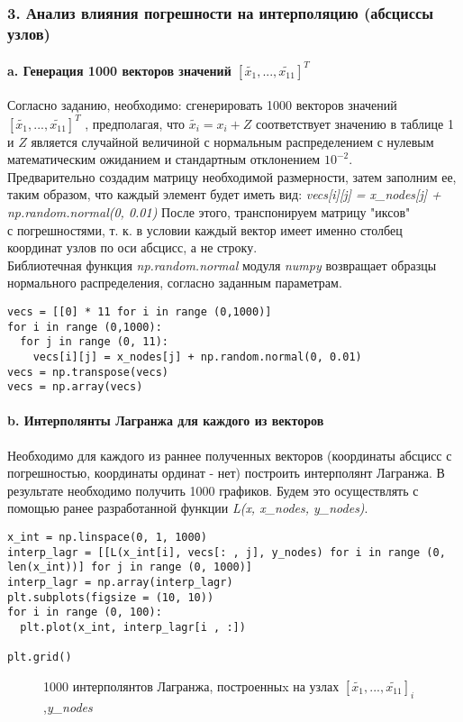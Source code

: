 \subsubsection{3. Анализ влияния погрешности на интерполяцию (абсциссы узлов)}
\paragraph{a. Генерация 1000 векторов значений $[\tilde{x_1}, ..., \tilde{x_{11}}]^T$ \\} 
\begin{flushleft} Согласно заданию, необходимо: сгенерировать 1000 векторов значений $[\tilde{x_1}, ..., \tilde{x_{11}}]^T$ , предполагая, что $\tilde{x_i} = x_i + Z$ соответствует значению в таблице 1 и $Z$ является случайной величиной с нормальным распределением с нулевым математическим ожиданием и стандартным отклонением $10^{-2}$. \\ Предварительно создадим матрицу необходимой размерности, затем заполним ее, таким образом, что каждый элемент будет иметь вид: 
\textit{vecs[i][j] = x_nodes[j] + np.random.normal(0, 0.01)}
После этого, транспонируем матрицу "иксов"\\с погрешностями, т. к. в условии каждый вектор имеет именно столбец координат узлов по оси абсцисс, а не строку. \\
Библиотечная функция \textit{np.random.normal } модуля \textit{numpy} возвращает образцы нормального распределения, согласно заданным параметрам.
\end{flushleft}
\begin{lstlisting} 
vecs = [[0] * 11 for i in range (0,1000)]
for i in range (0,1000):
  for j in range (0, 11):
    vecs[i][j] = x_nodes[j] + np.random.normal(0, 0.01)
vecs = np.transpose(vecs)
vecs = np.array(vecs)
\end{lstlisting} 
\paragraph{b. Интерполянты Лагранжа для каждого из векторов \\ }
\begin{flushleft}
Необходимо для каждого из раннее полученных векторов (координаты абсцисс с погрешностью, координаты ординат - нет) построить интерполянт Лагранжа. В результате необходимо получить 1000 графиков.
Будем это осуществлять с помощью ранее разработанной функции \textit{L(x, x_nodes, y_nodes)}.
\end{flushleft}
\begin{lstlisting} 
x_int = np.linspace(0, 1, 1000)
interp_lagr = [[L(x_int[i], vecs[: , j], y_nodes) for i in range (0, len(x_int))] for j in range (0, 1000)] 
interp_lagr = np.array(interp_lagr)
plt.subplots(figsize = (10, 10))
for i in range (0, 100):  
  plt.plot(x_int, interp_lagr[i , :])

plt.grid()
\end{lstlisting} 
\clearpage
\begin{figure}[t]
\caption{1000 интерполянтов Лагранжа, построенныx на узлах $[\tilde{x_1}, ..., \tilde{x_{11}}]_i$,\textit{y_nodes}}
\end{figure}
